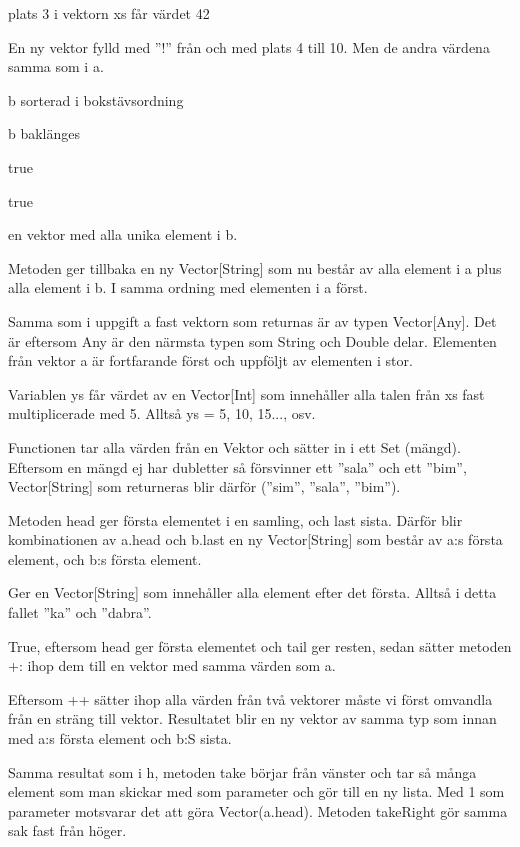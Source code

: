 \Subtask  plats 3 i vektorn xs får värdet 42

\Subtask  En ny vektor fylld med ''!'' från och med plats 4 till 10. Men de andra värdena samma som i a.

\Subtask  b sorterad i bokstävsordning

\Subtask  b baklänges

\Subtask  true

\Subtask  true

\Subtask  en vektor med alla unika element i b.

\Task %

\Subtask
Metoden ger tillbaka en ny Vector[String] som nu består av alla element i a plus alla element i b. I samma ordning med elementen i a först.

\Subtask
Samma som i uppgift a fast vektorn som returnas är av typen Vector[Any]. Det är eftersom Any är den närmsta typen som String och Double delar. Elementen från vektor a är fortfarande först och uppföljt av elementen i stor.

\Subtask
Variablen ys får värdet av en Vector[Int] som innehåller alla talen från xs fast multiplicerade med 5. Alltså ys = 5, 10, 15..., osv.

\Subtask
Functionen tar alla värden från en Vektor och sätter in i ett Set (mängd). Eftersom en mängd ej har dubletter så försvinner ett ''sala'' och ett ''bim'', Vector[String] som returneras blir därför (''sim'', ''sala'', ''bim'').

\Subtask
Metoden head ger första elementet i en samling, och last sista. Därför blir kombinationen av a.head och b.last en ny Vector[String] som består av a:s första element, och b:s första element.

\Subtask
Ger en Vector[String] som innehåller alla element efter det första. Alltså i detta fallet ''ka'' och ''dabra''.

\Subtask
True, eftersom head ger första elementet och tail ger resten, sedan sätter metoden +: ihop dem till en vektor med samma värden som a.

\Subtask
Eftersom ++ sätter ihop alla värden från två vektorer måste vi först omvandla från en sträng till vektor. Resultatet blir en ny vektor av samma typ som innan med a:s första element och b:S sista.

\Subtask
Samma resultat som i h, metoden take börjar från vänster och tar så många element som man skickar med som parameter och gör till en ny lista. Med 1 som parameter motsvarar det att göra Vector(a.head). Metoden takeRight gör samma sak fast från höger.

